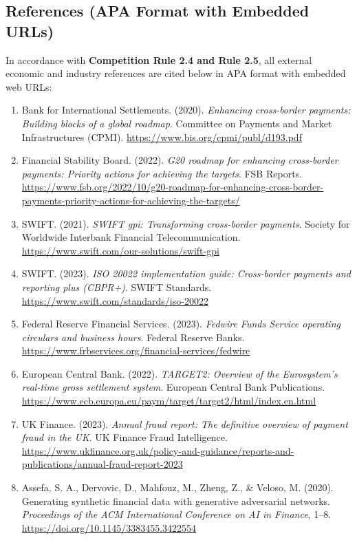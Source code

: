 \documentclass[11pt,a4paper]{article}
\begin{document}
\subsection{References (APA Format with Embedded URLs)}
In accordance with \textbf{Competition Rule 2.4 and Rule 2.5}, all external economic and industry references are cited below in APA format with embedded web URLs:

\begin{enumerate}
    \item Bank for International Settlements. (2020). \textit{Enhancing cross-border payments: Building blocks of a global roadmap}. Committee on Payments and Market Infrastructures (CPMI). \url{https://www.bis.org/cpmi/publ/d193.pdf}
    \item Financial Stability Board. (2022). \textit{G20 roadmap for enhancing cross-border payments: Priority actions for achieving the targets}. FSB Reports. \url{https://www.fsb.org/2022/10/g20-roadmap-for-enhancing-cross-border-payments-priority-actions-for-achieving-the-targets/}
    \item SWIFT. (2021). \textit{SWIFT gpi: Transforming cross-border payments}. Society for Worldwide Interbank Financial Telecommunication. \url{https://www.swift.com/our-solutions/swift-gpi}
    \item SWIFT. (2023). \textit{ISO 20022 implementation guide: Cross-border payments and reporting plus (CBPR+)}. SWIFT Standards. \url{https://www.swift.com/standards/iso-20022}
    \item Federal Reserve Financial Services. (2023). \textit{Fedwire Funds Service operating circulars and business hours}. Federal Reserve Banks. \url{https://www.frbservices.org/financial-services/fedwire}
    \item European Central Bank. (2022). \textit{TARGET2: Overview of the Eurosystem's real-time gross settlement system}. European Central Bank Publications. \url{https://www.ecb.europa.eu/paym/target/target2/html/index.en.html}
    \item UK Finance. (2023). \textit{Annual fraud report: The definitive overview of payment fraud in the UK}. UK Finance Fraud Intelligence. \url{https://www.ukfinance.org.uk/policy-and-guidance/reports-and-publications/annual-fraud-report-2023}
    \item Assefa, S. A., Dervovic, D., Mahfouz, M., Zheng, Z., \& Veloso, M. (2020). Generating synthetic financial data with generative adversarial networks. \textit{Proceedings of the ACM International Conference on AI in Finance}, 1--8. \url{https://doi.org/10.1145/3383455.3422554}
\end{enumerate}
\end{document}
